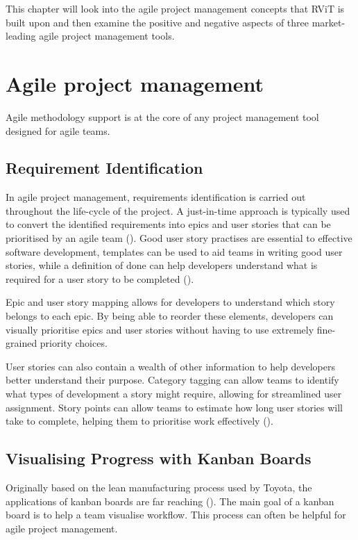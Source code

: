 \documentclass[l4proj.tex]{subfiles}
\begin{document}
    

This chapter will look into the agile project management concepts that RViT is built upon and then examine the positive and negative aspects of three market-leading agile project management tools.

\section{Agile project management}
Agile methodology support is at the core of any project management tool designed for agile teams.

\subsection{Requirement Identification}
In agile project management, requirements identification is carried out throughout the life-cycle of the project. A just-in-time approach is typically used to convert the identified requirements into epics and user stories that can be prioritised by an agile team (\cite{Schon2017}). Good user story practises are essential to effective software development, templates can be used to aid teams in writing good user stories, while a definition of done can help developers understand what is required for a user story to be completed (\cite{Silva2017}).

Epic and user story mapping allows for developers to understand which story belongs to each epic. By being able to reorder these elements, developers can visually prioritise epics and user stories without having to use extremely fine-grained priority choices.

User stories can also contain a wealth of other information to help developers better understand their purpose. Category tagging can allow teams to identify what types of development a story might require, allowing for streamlined user assignment. Story points can allow teams to estimate how long user stories will take to complete, helping them to prioritise work effectively (\cite{Coelho2012}). 


\subsection{Visualising Progress with Kanban Boards}
Originally based on the lean manufacturing process used by Toyota, the applications of kanban boards are far reaching (\cite{Ahmad2018}). The main goal of a kanban board is to help a team visualise workflow. This process can often be helpful for agile project management.
\end{document}
